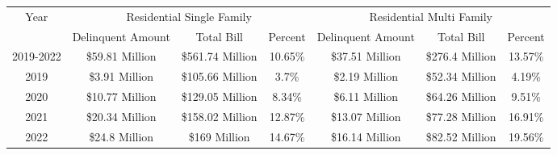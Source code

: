 \begin{tabular}{c|ccc|ccc}
\toprule 
\midrule 
Year & \multicolumn{3}{c}{Residential Single Family} & \multicolumn{3}{c}{Residential Multi Family} \\
 \cmidrule(lr){2-4} \cmidrule(lr){5-7} 
 & Delinquent Amount & Total Bill & Percent & Delinquent Amount & Total Bill & Percent \\
\midrule 
2019-2022 & \$59.81 Million & \$561.74 Million & 10.65\% & \$37.51 Million & \$276.4 Million & 13.57\% \\
2019 & \$3.91 Million & \$105.66 Million & 3.7\% & \$2.19 Million & \$52.34 Million & 4.19\% \\
2020 & \$10.77 Million & \$129.05 Million & 8.34\% & \$6.11 Million & \$64.26 Million & 9.51\% \\
2021 & \$20.34 Million & \$158.02 Million & 12.87\% & \$13.07 Million & \$77.28 Million & 16.91\% \\
2022 & \$24.8 Million & \$169 Million & 14.67\% & \$16.14 Million & \$82.52 Million & 19.56\% \\
\midrule 
\bottomrule 
\end{tabular}
